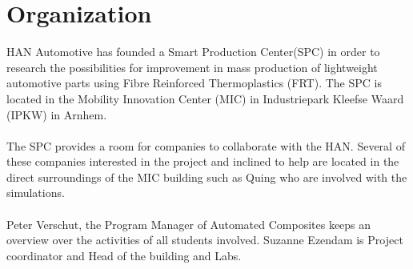 
\chapter{Organization}

HAN Automotive has founded a Smart Production Center(SPC) in order to research the possibilities for improvement in mass production of lightweight automotive parts using Fibre Reinforced Thermoplastics (FRT). The SPC is located in the Mobility Innovation Center (MIC) in 
Industriepark Kleefse Waard (IPKW)
 in Arnhem. \\
 \\
 The SPC provides a room for companies to collaborate with the HAN.  Several of these companies interested in the project and inclined to help are located in the direct surroundings of the MIC building such as Quing who are involved with the simulations. \\
 \\
 Peter Verschut, the Program Manager of Automated Composites keeps an overview over the activities of all students involved. Suzanne Ezendam is Project coordinator and Head of the building and Labs.\\